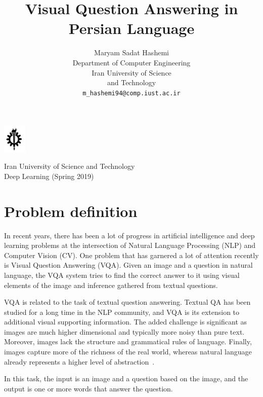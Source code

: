 \documentclass{article}
\title{Visual Question Answering in Persian Language}
\author{%
  Maryam Sadat Hashemi\\
  Department of Computer Engineering\\
  Iran University of Science \\ and Technology\\
  \texttt{m\_hashemi94@comp.iust.ac.ir} \\
}
\begin{document}
\noindent\begin{minipage}{0.1\textwidth}%
\includegraphics[width=1.1cm]{images/iust_logo.png}
\end{minipage}%
\hfill%
\begin{minipage}{1\textwidth}\raggedright
Iran University of Science and Technology\\
Deep Learning (Spring 2019)\\
\end{minipage}

\maketitle


\section{Problem definition}
 In recent years, there has been a lot of progress in artificial intelligence and deep learning problems at the intersection of Natural Language Processing (NLP) and Computer Vision (CV). One problem that has garnered a lot of attention recently is Visual Question Answering (VQA). Given an image and a question in natural language, the VQA system tries to find the correct answer to it using visual elements of the image and inference gathered from textual questions. 
 
 VQA is related to the task of textual question answering. Textual QA has been studied for a long time in the NLP community, and VQA is its extension to additional visual supporting information. The added challenge is significant as images are much higher dimensional and typically more noisy than pure text. Moreover, images lack the structure and grammatical rules of language. Finally, images capture more of the richness of the real world, whereas natural language already represents a higher level of abstraction~\cite{Srivastava2019VisualQA}.
 
 In this task, the input is an image and a question based on the image, and the output is one or more words that answer the question.
 
\end{document}
